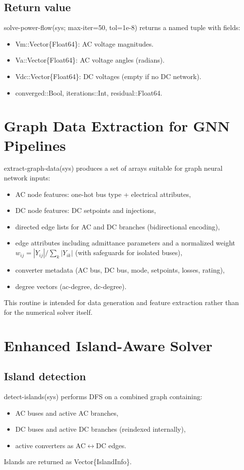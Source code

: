 \documentclass[11pt]{article}
\def\code#1{#1}%
\def\_{-}%
\newcommand{\code}[1]{\nolinkurl{#1}}
\begin{document}
\subsection{Return value}
\code{solve\_power\_flow(sys; max\_iter=50, tol=1e-8)} returns a named tuple with fields:
\begin{itemize}[leftmargin=*]
  \item \code{Vm::Vector\{Float64\}}: AC voltage magnitudes.
  \item \code{Va::Vector\{Float64\}}: AC voltage angles (radians).
  \item \code{Vdc::Vector\{Float64\}}: DC voltages (empty if no DC network).
  \item \code{converged::Bool}, \code{iterations::Int}, \code{residual::Float64}.
\end{itemize}

\section{Graph Data Extraction for GNN Pipelines}
\code{extract\_graph\_data(sys)} produces a set of arrays suitable for graph neural network inputs:
\begin{itemize}[leftmargin=*]
  \item AC node features: one-hot bus type + electrical attributes,
  \item DC node features: DC setpoints and injections,
  \item directed edge lists for AC and DC branches (bidirectional encoding),
  \item edge attributes including admittance parameters and a normalized weight
        $w_{ij} = |Y_{ij}| / \sum_k |Y_{ik}|$ (with safeguards for isolated buses),
  \item converter metadata (AC bus, DC bus, mode, setpoints, losses, rating),
  \item degree vectors (\code{ac\_degree}, \code{dc\_degree}).
\end{itemize}
This routine is intended for data generation and feature extraction rather than for the numerical solver itself.

\section{Enhanced Island-Aware Solver}\label{sec:enhanced-solver}

\subsection{Island detection}
\code{detect\_islands(sys)} performs DFS on a combined graph containing:
\begin{itemize}[leftmargin=*]
  \item AC buses and active AC branches,
  \item DC buses and active DC branches (reindexed internally),
  \item active converters as AC$\leftrightarrow$DC edges.
\end{itemize}
Islands are returned as \code{Vector\{IslandInfo\}}.
\end{document}
